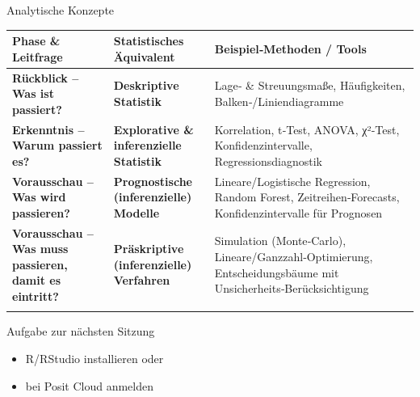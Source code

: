 \documentclass[
  ignorenonframetext,
]{beamer}
\newcounter{none} %
\providecommand{\tightlist}{%
  \setlength{\itemsep}{0pt}\setlength{\parskip}{0pt}}
\begin{document}
\begin{frame}{Analytische Konzepte}
\protect{}\label{analytische-konzepte}
{\def\LTcaptype{none} %
\begin{longtable}[]{@{}
  >{\raggedright\arraybackslash}p{}
  >{\raggedright\arraybackslash}p{}
  >{\raggedright\arraybackslash}p{}@{}}
\toprule\noalign{}
\begin{minipage}[b]{\linewidth}\raggedright
Phase \& Leitfrage
\end{minipage} & \begin{minipage}[b]{\linewidth}\raggedright
Statistisches Äquivalent
\end{minipage} & \begin{minipage}[b]{\linewidth}\raggedright
Beispiel‑Methoden / Tools
\end{minipage} \\
\midrule\noalign{}
\endhead
\textbf{Rückblick -- Was ist passiert?} & \textbf{Deskriptive Statistik}
& Lage‑ \& Streuungsmaße, Häufigkeiten, Balken‑/Liniendiagramme \\
\textbf{Erkenntnis -- Warum passiert es?} & \textbf{Explorative \&
inferenzielle Statistik} & Korrelation, t‑Test, ANOVA, χ²‑Test,
Konfidenz\-intervalle, Regressionsdiagnostik \\
\textbf{Vorausschau -- Was wird passieren?} & \textbf{Prognostische
(inferenzielle) Modelle} & Lineare/Logistische Regression, Random
Forest, Zeitreihen‑Forecasts, Konfidenz\-intervalle für Prognosen \\
\textbf{Vorausschau -- Was muss passieren, damit es eintritt?} &
\textbf{Präskriptive (inferenzielle) Verfahren} & Simulation
(Monte‑Carlo), Lineare/Ganzzahl‑Optimierung, Entscheidungsbäume mit
Unsicherheits‑Berücksichtigung \\
\bottomrule\noalign{}
\end{longtable}
}
\end{frame}

\begin{frame}{Aufgabe zur nächsten Sitzung}
\protect{}\label{aufgabe-zur-nuxe4chsten-sitzung}
\begin{itemize}
\tightlist
\item
  R/RStudio installieren oder
\item
  bei Posit Cloud anmelden
\end{itemize}
\end{frame}
\end{document}
